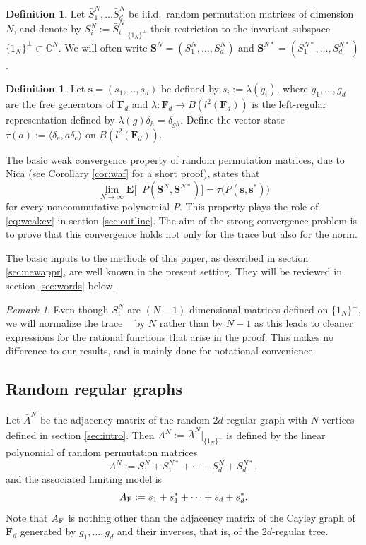 \documentclass[10pt,reqno]{amsart}
\theoremstyle{definition}
\newtheorem{defn}[thm]{Definition}
\theoremstyle{remark}
\newtheorem{rem}[thm]{Remark}
\numberwithin{equation}{section}
\numberwithin{figure}{section}
\numberwithin{table}{section}
\newcommand{\ntrN}{\mathop{\mathrm{tr}_N}}
\begin{document}
\begin{defn}
Let $\bar S_1^N,\ldots \bar S_d^N$ be 
i.i.d.\ random permutation matrices of dimension $N$, and denote by 
$S_i^N:= \bar S_i^N|_{\{1_N\}^\perp}$ their restriction to the invariant 
subspace $\{1_N\}^\perp\subset\mathbb{C}^N$. We will often write 
$\boldsymbol{S}^N=(S_1^N,\ldots,S_d^N)$ and
$\boldsymbol{S}^{N*}=(S_1^{N*},\ldots,S_d^{N*})$.
\end{defn}

\begin{defn}
Let $\boldsymbol{s}=(s_1,\ldots,s_d)$ be defined by $s_i:=\lambda(g_i)$, 
where $g_1,\ldots,g_d$ are the free generators of $\mathbf{F}_d$ and 
$\lambda:\mathbf{F}_d \to B(l^2(\mathbf{F}_d))$ is the left-regular 
representation defined by 
$\lambda(g)\delta_h=\delta_{gh}$. Define the vector state $\tau(a) := 
\langle \delta_e,a\delta_e\rangle$ on $B(l^2(\mathbf{F}_d))$.
\end{defn}

The basic weak convergence property of random permutation matrices, due to 
Nica \cite{Nic93} (see Corollary \ref{cor:waf} for a short proof), states 
that
$$
	\lim_{N\to\infty} 
	\mathbf{E}\big[\ntrN P(\boldsymbol{S}^N,\boldsymbol{S}^{N*})\big]
	=
	\tau\big(P(\boldsymbol{s},\boldsymbol{s}^*)\big)
$$
for every noncommutative polynomial $P$. This property plays the role of
\eqref{eq:weakcv} in section \ref{sec:outline}. The aim of the strong 
convergence problem is to prove that this convergence holds not only for 
the trace but also for the norm.

The basic inputs to the methods of this paper, as described in section 
\ref{sec:newappr}, are well known in the present setting.
They will be reviewed in section \ref{sec:words} below.

\begin{rem}
Even though $S_i^N$ are $(N-1)$-dimensional matrices defined on 
$\{1_N\}^\perp$, we will normalize the trace $\ntrN$ by $N$ rather than by 
$N-1$ as this leads to cleaner expressions for the rational functions that 
arise in the proof. This makes no difference to our results, 
and is mainly done for notational convenience.
\end{rem}


\subsection{Random regular graphs}
\label{sec:rregmain}

Let $\bar A^N$ be the adjacency matrix of the random $2d$-regular graph
with $N$ vertices defined in section \ref{sec:intro}. Then 
$A^N := \bar A^N|_{\{1_N\}^\perp}$ is defined by the linear polynomial
of random permutation matrices
$$
	A^N := S_1^N + S_1^{N*} + \cdots + S_d^N + S_d^{N*},
$$
and the associated limiting model is
$$
	A_{\rm F} := s_1 + s_1^* + \cdots + s_d + s_d^*.
$$
Note that $A_{\rm F}$ is nothing other than the adjacency matrix of the 
Cayley graph of $\mathbf{F}_d$ generated by $g_1,\ldots,g_d$ and their 
inverses, that is, of the $2d$-regular tree. 
\end{document}
